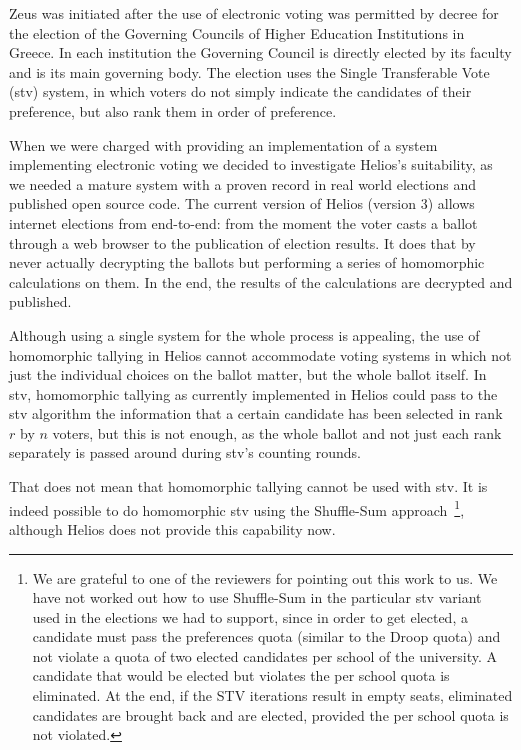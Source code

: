 \documentclass[letterpaper,10pt]{article}
\begin{document}
Zeus was initiated after the use of electronic voting was permitted by
decree for the election of the Governing Councils of Higher Education
Institutions in Greece. In each institution the Governing Council is
directly elected by its faculty and is its main governing body. The
election uses the Single Transferable Vote ({\sc stv}) system, in which
voters do not simply indicate the candidates of their preference, but
also rank them in order of preference. 

When we were charged with providing an implementation of a system
implementing electronic voting we decided to investigate Helios's
suitability, as we needed a mature system with a proven record in real
world elections and published open source code. The current version of
Helios (version 3) allows internet elections from end-to-end: from the
moment the voter casts a ballot through a web browser to the
publication of election results. It does that by never actually
decrypting the ballots but performing a series of homomorphic
calculations on them. In the end, the results of the calculations are
decrypted and published. 

Although using a single system for the whole process is appealing, the
use of homomorphic tallying in Helios cannot accommodate voting
systems in which not just the individual choices on the ballot matter,
but the whole ballot itself. In {\sc stv}, homomorphic tallying as
currently implemented in Helios could pass to the {\sc stv} algorithm
the information that a certain candidate has been selected in rank $r$
by $n$ voters, but this is not enough, as the whole ballot and not
just each rank separately is passed around during {\sc stv}'s counting
rounds.

That does not mean that homomorphic tallying cannot be used with {\sc
  stv}. It is indeed possible to do homomorphic {\sc stv} using the
Shuffle-Sum approach~\cite{benaloh:2009}\footnote{We are grateful to
  one of the reviewers for pointing out this work to us. We have not
  worked out how to use Shuffle-Sum in the particular {\sc stv}
  variant used in the elections we had to support, since in order to
  get elected, a candidate must pass the preferences quota (similar to
  the Droop quota) and not violate a quota of two elected candidates
  per school of the university. A candidate that would be elected but
  violates the per school quota is eliminated. At the end, if the STV
  iterations result in empty seats, eliminated candidates are brought
  back and are elected, provided the per school quota is not violated.
}, although Helios does not provide this capability now.
\end{document}
